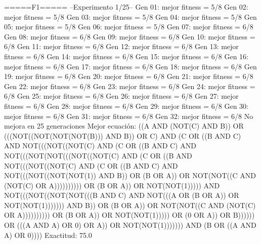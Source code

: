 =====F1=====
--Experimento 
 1/25--
Gen 01: mejor fitness = 5/8
Gen 02: mejor fitness = 5/8
Gen 03: mejor fitness = 5/8
Gen 04: mejor fitness = 5/8
Gen 05: mejor fitness = 5/8
Gen 06: mejor fitness = 5/8
Gen 07: mejor fitness = 6/8
Gen 08: mejor fitness = 6/8
Gen 09: mejor fitness = 6/8
Gen 10: mejor fitness = 6/8
Gen 11: mejor fitness = 6/8
Gen 12: mejor fitness = 6/8
Gen 13: mejor fitness = 6/8
Gen 14: mejor fitness = 6/8
Gen 15: mejor fitness = 6/8
Gen 16: mejor fitness = 6/8
Gen 17: mejor fitness = 6/8
Gen 18: mejor fitness = 6/8
Gen 19: mejor fitness = 6/8
Gen 20: mejor fitness = 6/8
Gen 21: mejor fitness = 6/8
Gen 22: mejor fitness = 6/8
Gen 23: mejor fitness = 6/8
Gen 24: mejor fitness = 6/8
Gen 25: mejor fitness = 6/8
Gen 26: mejor fitness = 6/8
Gen 27: mejor fitness = 6/8
Gen 28: mejor fitness = 6/8
Gen 29: mejor fitness = 6/8
Gen 30: mejor fitness = 6/8
Gen 31: mejor fitness = 6/8
Gen 32: mejor fitness = 6/8
No mejora en 25 generaciones
Mejor ecuación: ((A AND (NOT(C) AND B)) OR (((NOT((NOT(NOT(NOT(B))) AND B)) OR C) AND (C OR ((B AND C) AND NOT(((NOT((NOT(C) AND (C OR ((B AND C) AND NOT(((NOT(NOT(((NOT((NOT(C) AND (C OR ((B AND NOT(((NOT((NOT(C) AND (C OR ((B AND C) AND NOT(((NOT((NOT(NOT(1)) AND B)) OR (B OR A)) OR NOT(NOT((C AND (NOT(C) OR A)))))))))) OR (B OR A)) OR NOT(NOT(1))))) AND NOT(((NOT((NOT(NOT(((B AND C) AND NOT(((A OR (B OR A)) OR NOT(NOT(1))))))) AND B)) OR (B OR A)) OR NOT(NOT((C AND (NOT(C) OR A)))))))))) OR (B OR A)) OR NOT(NOT(1))))) OR (0 OR A)) OR B)))))) OR (((A AND A) OR 0) OR A)) OR NOT(NOT(1))))))) AND (B OR ((A AND A) OR 0))))
 Exactitud: 75.0%


